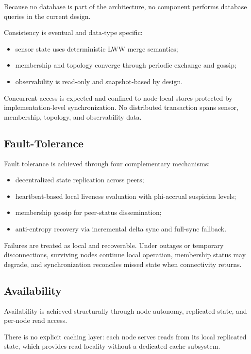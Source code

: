 Because no database is part of the architecture, no component performs database queries in the current design.

Consistency is eventual and data-type specific:
\begin{itemize}
  \item sensor state uses deterministic LWW merge semantics;
  \item membership and topology converge through periodic exchange and gossip;
  \item observability is read-only and snapshot-based by design.
\end{itemize}

Concurrent access is expected and confined to node-local stores protected by implementation-level synchronization. No distributed transaction spans sensor, membership, topology, and observability data.

\subsection{Fault-Tolerance}\label{fault-tolerance}

Fault tolerance is achieved through four complementary mechanisms:
\begin{itemize}
  \item decentralized state replication across peers;
  \item heartbeat-based local liveness evaluation with phi-accrual suspicion levels;
  \item membership gossip for peer-status dissemination;
  \item anti-entropy recovery via incremental delta sync and full-sync fallback.
\end{itemize}

Failures are treated as local and recoverable. Under outages or temporary disconnections, surviving nodes continue local operation, membership status may degrade, and synchronization reconciles missed state when connectivity returns.

\subsection{Availability}\label{availability}

Availability is achieved structurally through node autonomy, replicated state, and per-node read access.

There is no explicit caching layer: each node serves reads from its local replicated state, which provides read locality without a dedicated cache subsystem.

